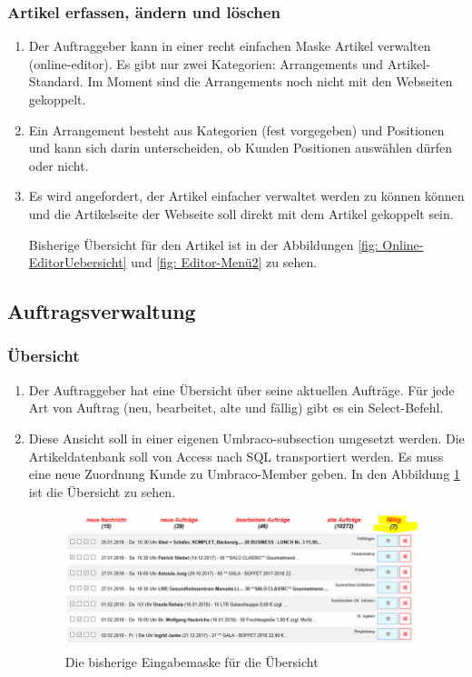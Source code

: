 \subsubsection{Artikel erfassen, ändern und löschen}

\begin{enumerate}
	\item Der Auftraggeber kann in einer recht einfachen Maske Artikel verwalten (online-editor). Es gibt nur zwei Kategorien: Arrangements und Artikel-Standard. Im Moment sind die Arrangements noch nicht mit den Webseiten gekoppelt.
	\item Ein Arrangement besteht aus Kategorien (fest vorgegeben) und Positionen und kann sich darin unterscheiden, ob Kunden Positionen auswählen dürfen oder nicht.
	\item Es wird angefordert, der Artikel einfacher verwaltet werden zu können können und die Artikelseite der Webseite soll direkt mit dem Artikel gekoppelt sein.
	
	Bisherige Übersicht für den Artikel ist in der Abbildungen \ref{fig: Online-EditorUebersicht} und \ref{fig: Editor-Menü2} zu sehen.
	
\end{enumerate} 


\subsection{Auftragsverwaltung}

\subsubsection{Übersicht}

\begin{enumerate}
	\item Der Auftraggeber hat eine Übersicht über seine aktuellen Aufträge. Für jede Art von Auftrag (neu, bearbeitet, alte und fällig) gibt es ein Select-Befehl.
	\item Diese Ansicht soll in einer eigenen Umbraco-subsection umgesetzt werden. Die Artikeldatenbank soll von Access nach SQL transportiert werden. Es muss eine neue Zuordnung Kunde zu Umbraco-Member geben.
	In den Abbildung \ref{fig:Uebersicht} ist die Übersicht zu sehen.
		\begin{figure}[h]
		\centering
		\includegraphics[width=0.7\linewidth]{Graphics/Uebersicht.png}
		\caption[Uebersicht]{Die bisherige Eingabemaske für die Übersicht}
		\label{fig:Uebersicht}
	\end{figure}
\end{enumerate} 



